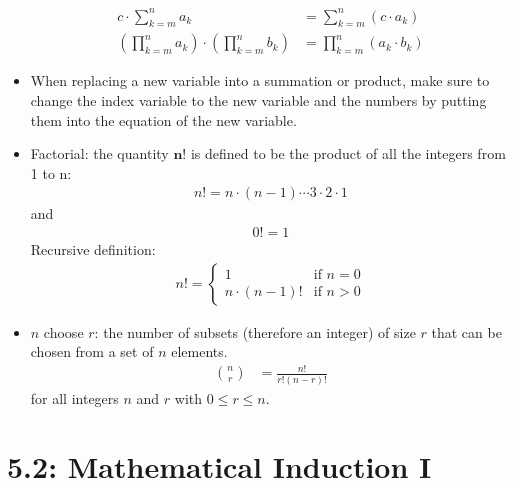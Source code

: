 \documentclass{article}
\begin{document}
\begin{itemize}
\begin{align}
                    c \cdot \sum_{k=m}^{n} a_k &= \sum_{k=m}^{n} (c \cdot a_k) \\
                    (\prod_{k=m}^{n} a_k) \cdot (\prod_{k=m}^{n} b_k) &= \prod_{k=m}^{n} (a_k \cdot b_k)
                \end{align}
            \item When replacing a new variable into a summation or product, make sure to change the index variable to the new variable and the numbers by putting them into the equation of the new variable.
            \item Factorial: the quantity $\mathbf{n!}$ is defined to be the product of all the integers from 1 to n:
                \begin{align*}
                    n! = n \cdot (n-1) \cdots 3 \cdot 2 \cdot 1
                \end{align*}
                and
                \begin{align*}
                    0! = 1
                \end{align*}
                Recursive definition:
                \begin{align*}
                    n! = \begin{cases}
                        1 & \text{if } n = 0 \\
                        n \cdot (n-1)! & \text{if } n > 0
                    \end{cases}
                \end{align*}
            \item $n$ choose $r$: the number of subsets (therefore an integer) of size $r$ that can be chosen from a set of $n$ elements.
                \begin{align*}
                    n \choose r &= \frac{n!}{r!(n-r)!}
                \end{align*}
                for all integers $n$ and $r$ with $0 \leq r \leq n$.
        \end{itemize}

\newpage \section{5.2: Mathematical Induction I}
\end{document}
